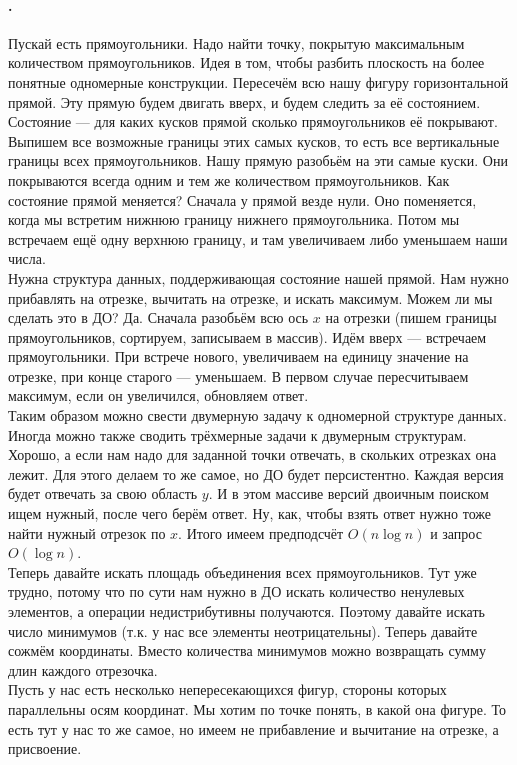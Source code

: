 \documentclass{article}
\begin{document}
    \paragraph{.}
    Пускай есть прямоугольники. Надо найти точку, покрытую максимальным количеством прямоугольников. Идея в том, чтобы разбить плоскость на более понятные одномерные конструкции. Пересечём всю нашу фигуру горизонтальной прямой. Эту прямую будем двигать вверх, и будем следить за её состоянием. Состояние --- для каких кусков прямой сколько прямоугольников её покрывают. Выпишем все возможные границы этих самых кусков, то есть все вертикальные границы всех прямоугольников. Нашу прямую разобьём на эти самые куски. Они покрываются всегда одним и тем же количеством прямоугольников. Как состояние прямой меняется? Сначала у прямой везде нули. Оно поменяется, когда мы встретим нижнюю границу нижнего прямоугольника. Потом мы встречаем ещё одну верхнюю границу, и там увеличиваем либо уменьшаем наши числа.\\
    Нужна структура данных, поддерживающая состояние нашей прямой. Нам нужно прибавлять на отрезке, вычитать на отрезке, и искать максимум. Можем ли мы сделать это в ДО? Да. Сначала разобьём всю ось $x$ на отрезки (пишем границы прямоугольников, сортируем, записываем в массив). Идём вверх --- встречаем прямоугольники. При встрече нового, увеличиваем на единицу значение на отрезке, при конце старого --- уменьшаем. В первом случае пересчитываем максимум, если он увеличился, обновляем ответ.\\
    Таким образом можно свести двумерную задачу к одномерной структуре данных. Иногда можно также сводить трёхмерные задачи к двумерным структурам.\\
    Хорошо, а если нам надо для заданной точки отвечать, в скольких отрезках она лежит. Для этого делаем то же самое, но ДО будет персистентно. Каждая версия будет отвечать за свою область $y$. И в этом массиве версий двоичным поиском ищем нужный, после чего берём ответ. Ну, как, чтобы взять ответ нужно тоже найти нужный отрезок по $x$. Итого имеем предподсчёт $O(n\log n)$ и запрос $O(\log n)$.\\
    Теперь давайте искать площадь объединения всех прямоугольников. Тут уже трудно, потому что по сути нам нужно в ДО искать количество ненулевых элементов, а операции недистрибутивны получаются. Поэтому давайте искать число минимумов (т.к. у нас все элементы неотрицательны). Теперь давайте сожмём координаты.  Вместо количества минимумов можно возвращать сумму длин каждого отрезочка.\\
    Пусть у нас есть несколько непересекающихся фигур, стороны которых параллельны осям координат. Мы хотим по точке понять, в какой она фигуре. То есть тут у нас то же самое, но имеем не прибавление и вычитание на отрезке, а присвоение.
\end{document}
